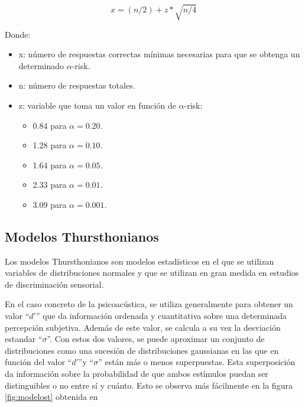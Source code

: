 \documentclass[11pt,a4paper,twoside]{book}
\begin{document}
            \begin{equation}
                x=(n/2)+z*\sqrt{n/4}
                \label{eq:alpha}
            \end{equation}
            
            Donde:
            \begin{itemize}
                \item x: número de respuestas correctas mínimas necesarias para que se obtenga un determinado $\alpha$-risk.
                \item n: número de respuestas totales.
                \item z: variable que toma un valor en función de $\alpha$-risk:
                \begin{itemize}
                    \item 0.84 para $\alpha=0.20$.
                    \item 1.28 para $\alpha=0.10$.
                    \item 1.64 para $\alpha=0.05$.
                    \item 2.33 para $\alpha=0.01$.
                    \item 3.09 para $\alpha=0.001$.
                    
                \end{itemize}
            \end{itemize}
        \subsection*{Modelos Thursthonianos}
            Los modelos Thursthonianos son modelos estadísticos en el que se utilizan variables de distribuciones normales y que se utilizan en gran medida en estudios de discriminación sensorial. 
            
            En el caso concreto de la psicoacústica, se utiliza generalmente para obtener un valor ``$d'$'' que da información ordenada y cuantitativa sobre una determinada percepción subjetiva. Además de este valor, se calcula a su vez la desviación estandar ``$\sigma$''. Con estos dos valores, se puede aproximar un conjunto de distribuciones como una sucesión de distribuciones gaussianas en las que en función del valor ``$d'$''y ``$\sigma$'' están más o menos superpuestas. Esta superposición da información sobre la probabilidad de que ambos estímulos puedan ser distinguibles o no entre sí y cuánto. Esto se observa más fácilmente en la figura \ref{fig:modelost} obtenida en \cite{PsychophysicsB} 
            
\end{document}
